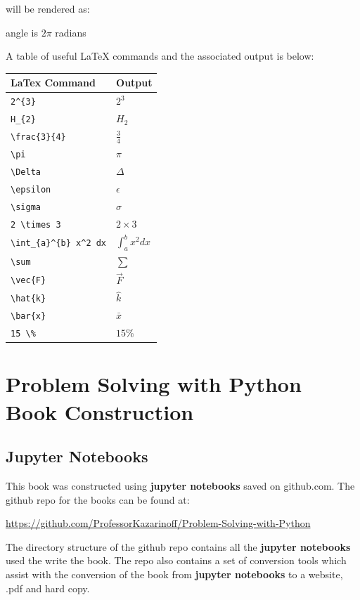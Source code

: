 \documentclass{book}
\begin{document}
will be rendered as:

angle is \(2\pi\) radians

A table of useful LaTeX commands and the associated output is below:

\begin{longtable}[]{@{}ll@{}}
\toprule
LaTex Command & Output\tabularnewline
\midrule
\endhead
\lstinline!2^{3}! & \(2^{3}\)\tabularnewline
\lstinline!H_{2}! & \(H_{2}\)\tabularnewline
\lstinline!\frac{3}{4}! & \(\frac{3}{4}\)\tabularnewline
\lstinline!\pi! & \(\pi\)\tabularnewline
\lstinline!\Delta! & \(\Delta\)\tabularnewline
\lstinline!\epsilon! & \(\epsilon\)\tabularnewline
\lstinline!\sigma! & \(\sigma\)\tabularnewline
\lstinline!2 \times 3! & \(2 \times 3\)\tabularnewline
\lstinline!\int_{a}^{b} x^2 dx! & \(\int_{a}^{b} x^2 dx\)\tabularnewline
\lstinline!\sum! & \(\sum\)\tabularnewline
\lstinline!\vec{F}! & \(\vec{F}\)\tabularnewline
\lstinline!\hat{k}! & \(\hat{k}\)\tabularnewline
\lstinline!\bar{x}! & \(\bar{x}\)\tabularnewline
\lstinline!15 \%! & \(15 \%\)\tabularnewline
\bottomrule
\end{longtable}
    




    
        \section{Problem Solving with Python Book
Construction}\label{problem-solving-with-python-book-construction}
    




    
        \subsection{Jupyter Notebooks}\label{jupyter-notebooks}
    




    
        This book was constructed using \textbf{jupyter notebooks} saved on
github.com. The github repo for the books can be found at:

\url{https://github.com/ProfessorKazarinoff/Problem-Solving-with-Python}
    




    
        The directory structure of the github repo contains all the
\textbf{jupyter notebooks} used the write the book. The repo also
contains a set of conversion tools which assist with the conversion of
the book from \textbf{jupyter notebooks} to a website, .pdf and hard
copy.
    
\end{document}
